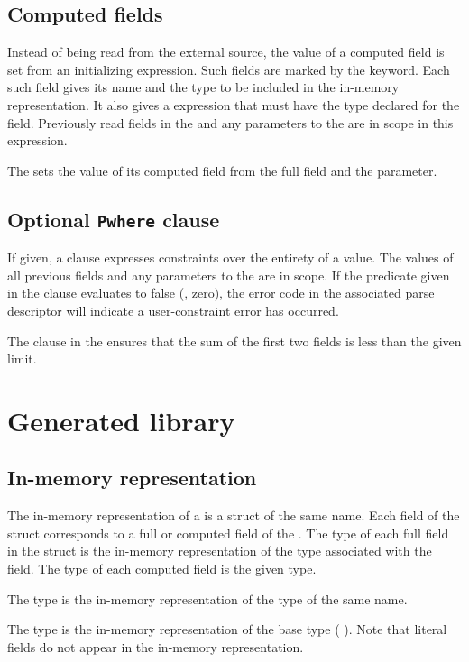 \subsection{Computed fields}
Instead of being read from the external source, the value of a
computed field is set from an initializing expression.  Such fields
are marked by the \Pcompute{} keyword.  Each such field gives its name
and the \C{} type to be included in the in-memory representation.  It
also gives a \C{} expression that must have the type declared for the
field.  Previously read fields in the \Pstruct{} and any parameters
to the \Pstruct{} are in scope in this expression.

The  \Pstruct{} sets the value of its computed
field  from the full field  and the 
parameter. 



\subsection{Optional \texttt{Pwhere} clause}
If given, a \Pwhere{} clause expresses constraints over the entirety
of a \Pstruct{} value.  The values of all previous fields and any
parameters to the \Pstruct{} are in scope.  If the predicate given in
the \Pwhere{} clause evaluates to false (\ie{}, zero), the error code
in the associated parse descriptor will indicate a user-constraint
error has occurred.  

The \Pwhere{} clause in the  \Pstruct{} ensures
that the sum of the first two fields is less than the given limit.


\section{Generated library}
\subsection{In-memory representation}
\label{sec:structs-rep}
The in-memory representation of a \Pstruct{} is a \C{} struct of the
same name.  Each field of the \C{} struct corresponds to a full or
computed field of the \Pstruct{}.  The type of each full field in
the \C{} struct is the in-memory representation of the \PADSL{} type
associated with the field.  The type of each computed field is 
the given \C{} type. 

The \C{} type  is the in-memory representation of
the \PADSL{} type of the same name.

The type  is the in-memory representation of the base
type  (\cf{} ).  Note that literal fields
do not appear in the in-memory representation. 

